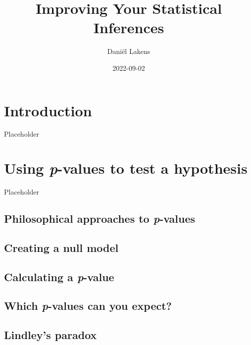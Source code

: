 \documentclass[
  oneside]{krantz}
\title{Improving Your Statistical Inferences}
\author{Daniël Lakens}
\date{2022-09-02}
\begin{document}
\maketitle

\listoffigures
\listoftables
\hypertarget{introduction}{%
\section*{Introduction}\label{introduction}}

Placeholder

\hypertarget{pvalue}{%
\section{\texorpdfstring{Using \emph{p}-values to test a
hypothesis}{Using p-values to test a hypothesis}}\label{pvalue}}

Placeholder

\hypertarget{philosophical-approaches-to-p-values}{%
\subsection{\texorpdfstring{Philosophical approaches to
\emph{p}-values}{Philosophical approaches to p-values}}\label{philosophical-approaches-to-p-values}}

\hypertarget{creating-a-null-model}{%
\subsection{Creating a null model}\label{creating-a-null-model}}

\hypertarget{calculating-a-p-value}{%
\subsection{\texorpdfstring{Calculating a
\emph{p}-value}{Calculating a p-value}}\label{calculating-a-p-value}}

\hypertarget{whichpexpect}{%
\subsection{\texorpdfstring{Which \emph{p}-values can you
expect?}{Which p-values can you expect?}}\label{whichpexpect}}

\hypertarget{lindley}{%
\subsection{Lindley's paradox}\label{lindley}}
\end{document}
